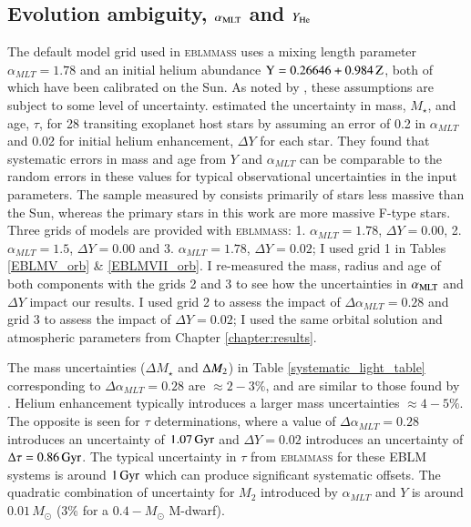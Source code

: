 

\subsection{Evolution ambiguity, $\alpha_{\rm MLT}$ and $Y_{\rm He}$}
The default model grid used in \textsc{eblmmass} uses a mixing length parameter $\alpha_{MLT} = 1.78$ and an initial helium abundance $\rm Y = 0.26646 + 0.984 \rm \,Z$, both of which have been calibrated on the Sun. As noted by \citet{2015A&A...575A..36M}, these assumptions are subject to some level of uncertainty.  \citet{2015A26A...577A..90M} estimated the uncertainty in mass, $M_{\star}$, and age, $\tau$, for 28 transiting exoplanet host stars by assuming an error of 0.2 in $\alpha_{MLT}$ and 0.02 for initial helium enhancement, $\Delta Y$ for each star. They found that systematic errors in mass and age from $Y$ and $\alpha_{MLT}$ can be comparable to the random errors in these values for typical observational uncertainties in the input parameters. The sample measured by \citet{2015A26A...577A..90M} consists primarily of stars less massive than the Sun, whereas the primary stars in this work are more massive F-type stars.  Three grids of models are provided with \textsc{eblmmass}: 1. $\alpha_{MLT} = 1.78$, $\Delta Y=0.00$, 2. $\alpha_{MLT} = 1.5$, $\Delta Y=0.00$ and 3. $\alpha_{MLT} = 1.78$, $\Delta Y=0.02$; I used grid 1 in Tables \ref{EBLMV_orb} \& \ref{EBLMVII_orb}. I re-measured the mass, radius and age of both components with the grids 2 and 3 to see how the uncertainties in $\alpha_{\rm MLT}$ and $\Delta Y$ impact our results. I used grid 2 to assess the impact of $\Delta \alpha_{MLT} = 0.28$ and grid 3 to assess the impact of $\Delta Y = 0.02$; I used the same orbital solution and atmospheric parameters from Chapter \ref{chapter:results}.


The mass uncertainties ($\Delta M_{\star}$ and $\Delta M_{\rm 2}$) in Table \ref{systematic_light_table} corresponding to $\Delta \alpha_{MLT} = 0.28$ are $ \approx 2-3 \%$, and are similar to those found by \citet{2015A26A...577A..90M}. Helium enhancement typically introduces a larger mass uncertainties $\approx 4-5 \%$. The opposite is seen for $\tau$ determinations, where a value of $\Delta \alpha_{MLT} = 0.28$ introduces an uncertainty of $1.07\, \rm Gyr$ and $\Delta Y = 0.02$ introduces an uncertainty of $\Delta \tau = 0.86\, \rm Gyr$. The typical uncertainty in $\tau$ from \textsc{eblmmass} for these EBLM systems is around $1\, \rm Gyr$ which can produce significant systematic offsets. The quadratic combination of uncertainty for $M_2$ introduced by $\alpha_{MLT}$ and $Y$ is around $0.01 \, M_{\odot}$ (3\% for a $0.4-M_{\odot}$ M-dwarf).

